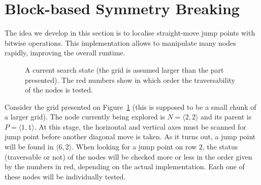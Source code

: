 \section{Block-based Symmetry Breaking}
\label{sec::blocks2}

The idea we develop in this section 
is to localise straight-move jump points with bitwise operations.  
This implementation allows to manipulate 
many nodes rapidly, 
improving the overall runtime.  

\begin{figure}[ht]
  \begin{center}
  \end{center}
  \caption{A current search state 
    (the grid is assumed larger than the part presented).
  The red numbers show in which order the traversability of the nodes 
  is tested.}
  \label{fig::gridforblocks}
\end{figure}

Consider the grid presented on Figure~\ref{fig::gridforblocks} 
(this is supposed to be a small chunk of a larger grid).  
The node currently being explored is $N = \langle 2,2\rangle$ 
and its parent is $P = \langle 1,1\rangle$.  
At this stage, the horizontal and vertical axes must be scanned 
for jump point before another diagonal move is taken.  
As it turns out, a jump point will be found in $\langle 6,2\rangle$.  
When looking for a jump point on row $2$, 
the status (traversable or not) of the nodes 
will be checked more or less in the order given by the numbers in red, 
depending on the actual implementation.  
Each one of these nodes will be individually tested.  

